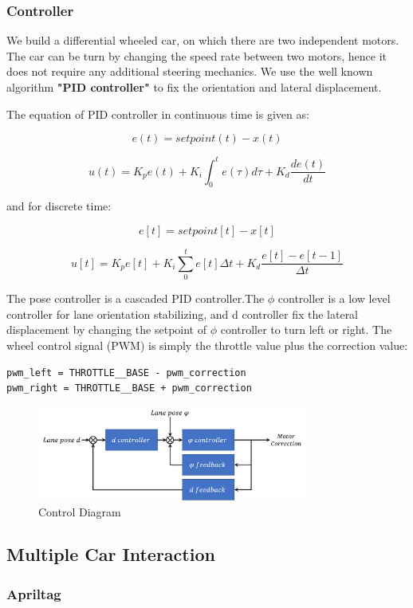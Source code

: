 \documentclass[conference]{IEEEtran}
\begin{document}
\subsubsection{Controller}We build a differential wheeled car, on which there are two independent motors. The car can be turn by changing the speed rate between two motors, hence it does not require any additional steering mechanics.
	We use the well known algorithm \textbf{"PID controller"} to fix the orientation and lateral displacement.

The equation of PID controller in continuous time is given as:

\[e(t) = setpoint(t) - x(t)\]

\[u(t) = K_p e(t) + K_i \int_{0}^{t} e(\tau) d\tau + K_d  \frac{de(t)}{dt}\]

and for discrete time:

\[e[t] = setpoint[t] - x[t]\]

\[u[t] = K_p e[t] + K_i \sum_0^t e[t] \Delta t + K_d \frac{e[t] - e[t-1]}{\Delta t}\]

	The pose controller is a cascaded PID controller.The $\phi$ controller is a low level controller for lane orientation stabilizing, and d controller fix the lateral displacement by changing the setpoint of $\phi$ controller to turn left or right.
The wheel control signal (PWM) is simply the throttle value plus the correction value:

\begin{lstlisting}
pwm_left = THROTTLE__BASE - pwm_correction
pwm_right = THROTTLE__BASE + pwm_correction
\end{lstlisting}

\begin{figure}	
	\centering
	\includegraphics[width=3.5in]{img/controller.png}
	\caption{Control Diagram}
	\label{fig:controller}
\end{figure}

\subsection{Multiple Car Interaction}

\subsubsection{Apriltag}
\end{document}
